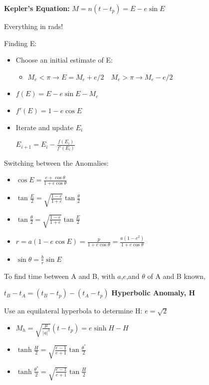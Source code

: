 \documentclass{article}
\begin{document}
\begin{multicols*}{3}
    \textbf{Kepler's Equation:} $M=n(t-t_p)=E-e\sin{E}$\par 
    Everything in rads!

    Finding E:\par 
    \begin{itemize}
        \item Choose an initial estimate of E:
        \begin{itemize}
            \item $M_e < \pi \rightarrow E = M_e + e/2 \quad M_e > \pi \rightarrow M_e - e/2$
        \end{itemize}
        \item $f(E) = E-e\sin{E}-M_e$
        \item $f'(E) = 1-e\cos{E}$
        \item Iterate and update $E_i$\par 
        $E_{i+1} = E_i - \frac{f(E_i)}{f'(E_i)}$ 
    \end{itemize}

    Switching between the Anomalies:\par
    \begin{itemize}
        \item $\cos{E} = \frac{e+\cos{\theta}}{1+e\cos{\theta}}$
        \item $\tan{\frac{E}{2}}=\sqrt{\frac{1-e}{1+e}}\tan{\frac{\theta}{2}}$
        \item $\tan{\frac{\theta}{2}}=\sqrt{\frac{1-e}{1+e}}\tan{\frac{E}{2}}$
        \item $r = a(1-e\cos{E})=\frac{p}{1+e\cos{\theta}}=\frac{a(1-e^2)}{1+e\cos{\theta}}$
        \item $\sin{\theta}=\frac{b}{r}\sin{E}$
    \end{itemize}

    To find time between A and B, with $a$,$e$,and $\theta$ of A and B known,\par 
    $t_B-t_A=(t_B-t_p)-(t_A-t_p)$
    \newpage
    \textbf{Hyperbolic Anomaly, H}\par 
    Use an equilateral hyperbola to determine H: $e = \sqrt{2}$\par 
    \begin{itemize}
        \item $M_h=\sqrt{\frac{\mu}{|a|^3}}(t-t_p)=e\sinh{H}-H$
        \item $\tanh{\frac{H}{2}}=\sqrt{\frac{e-1}{e+1}}\tan{\frac{\theta^*}{2}}$
        \item $\tanh{\frac{\theta^*}{2}}=\sqrt{\frac{e-1}{e+1}}\tan{\frac{H}{2}}$
    \end{itemize}


\end{multicols*}
\end{document}

